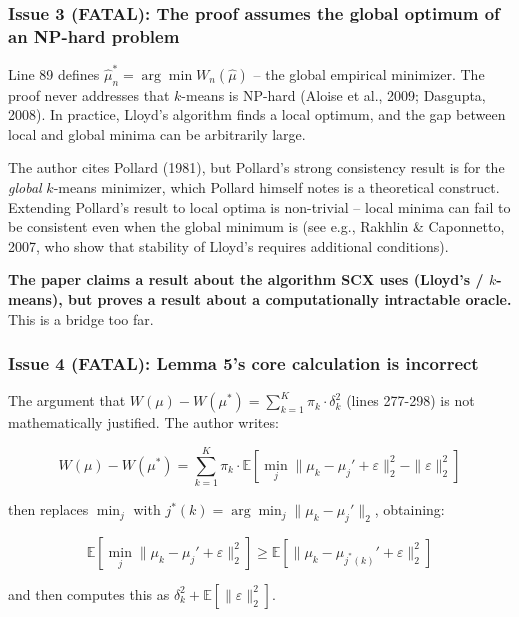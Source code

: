 \documentclass[
  12pt,
]{ctexart}
\begin{document}
\subsubsection{Issue 3 (FATAL): The proof assumes the global optimum of
an NP-hard
problem}\label{issue-3-fatal-the-proof-assumes-the-global-optimum-of-an-np-hard-problem}

Line 89 defines \(\hat{\mu}_n^* = \arg\min W_n(\hat{\mu})\) -- the
global empirical minimizer. The proof never addresses that \(k\)-means
is NP-hard (Aloise et al., 2009; Dasgupta, 2008). In practice, Lloyd's
algorithm finds a local optimum, and the gap between local and global
minima can be arbitrarily large.

The author cites Pollard (1981), but Pollard's strong consistency result
is for the \emph{global} \(k\)-means minimizer, which Pollard himself
notes is a theoretical construct. Extending Pollard's result to local
optima is non-trivial -- local minima can fail to be consistent even
when the global minimum is (see e.g., Rakhlin \& Caponnetto, 2007, who
show that stability of Lloyd's requires additional conditions).

\textbf{The paper claims a result about the algorithm SCX uses (Lloyd's
/ \(k\)-means), but proves a result about a computationally intractable
oracle.} This is a bridge too far.

\subsubsection{Issue 4 (FATAL): Lemma 5's core calculation is
incorrect}\label{issue-4-fatal-lemma-5s-core-calculation-is-incorrect}

The argument that
\(W(\mu) - W(\mu^*) = \sum_{k=1}^K \pi_k \cdot \delta_k^2\) (lines
277-298) is not mathematically justified. The author writes:

\[W(\mu) - W(\mu^*) = \sum_{k=1}^K \pi_k \cdot \mathbb{E}\left[ \min_j \|\mu_k - \mu_j' + \varepsilon\|_2^2 - \|\varepsilon\|_2^2 \right]\]

then replaces \(\min_j\) with
\(j^*(k) = \arg\min_j \|\mu_k - \mu_j'\|_2\), obtaining:

\[\mathbb{E}\left[ \min_j \|\mu_k - \mu_j' + \varepsilon\|_2^2 \right] \geq \mathbb{E}\left[ \|\mu_k - \mu_{j^*(k)}' + \varepsilon\|_2^2 \right]\]

and then computes this as
\(\delta_k^2 + \mathbb{E}[\|\varepsilon\|_2^2]\).
\end{document}
